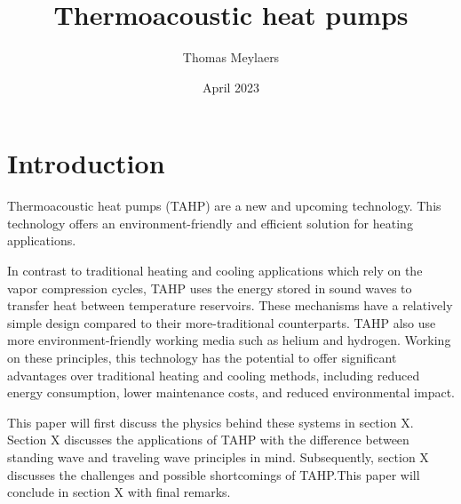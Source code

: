 \documentclass{article}
\title{Thermoacoustic heat pumps}
\author{Thomas Meylaers}
\date{April 2023}
\newcommand{\newpara}
    {
      \bigbreak{}
      \noindent
    }
\begin{document}
\maketitle

\newpage

\begin{abstract}

\end{abstract}

\newpage

\tableofcontents

\newpage


\section{Introduction}
Thermoacoustic heat pumps (TAHP) are a new and upcoming technology. This technology offers an environment-friendly and efficient solution for heating applications.
\newpara{}
In contrast to traditional heating and cooling applications which rely on the vapor compression cycles, TAHP uses the energy stored in sound waves to transfer heat between temperature reservoirs. These mechanisms have a relatively simple design compared to their more-traditional counterparts. TAHP also use more environment-friendly working media such as helium and hydrogen.
Working on these principles, this technology has the potential to offer significant advantages over traditional heating and cooling methods, including reduced energy consumption, lower maintenance costs, and reduced environmental impact.
\newpara{}
This paper will first discuss the physics behind these systems in section X. Section X discusses the applications of TAHP with the difference between standing wave and traveling wave principles in mind. Subsequently, section X discusses the challenges and possible shortcomings of TAHP.\@ This paper will conclude in section X with final remarks.
\end{document}
